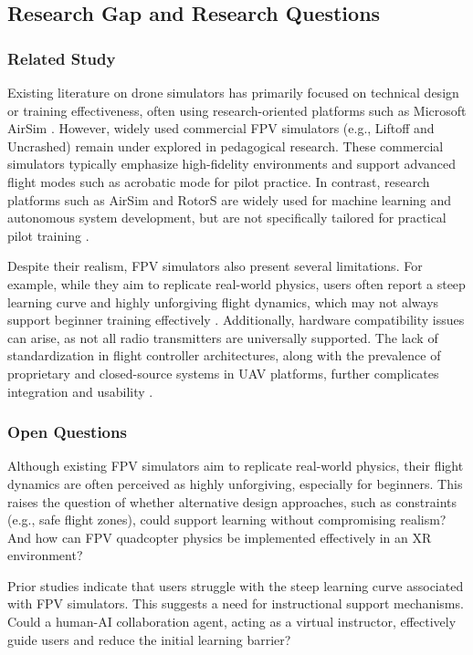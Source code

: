 \subsection{Research Gap and Research Questions}

\subsubsection{Related Study}

Existing literature on drone simulators has primarily focused on technical design or training effectiveness, often using research-oriented platforms such as Microsoft AirSim \parencite{shah_airsim_2017}. However, widely used commercial FPV simulators (e.g., Liftoff and Uncrashed) remain under explored in pedagogical research. These commercial simulators typically emphasize high-fidelity environments and support advanced flight modes such as acrobatic mode for pilot practice. In contrast, research platforms such as AirSim and RotorS are widely used for machine learning and autonomous system development, but are not specifically tailored for practical pilot training \parencite{pappas_generic_2025}.

Despite their realism, FPV simulators also present several limitations. For example, while they aim to replicate real-world physics, users often report a steep learning curve and highly unforgiving flight dynamics, which may not always support beginner training effectively \parencite{guide_best_2026}. Additionally, hardware compatibility issues can arise, as not all radio transmitters are universally supported. The lack of standardization in flight controller architectures, along with the prevalence of proprietary and closed-source systems in UAV platforms, further complicates integration and usability \parencite{ebeid_survey_2018}.

\subsubsection{Open Questions}

Although existing FPV simulators aim to replicate real-world physics, their flight dynamics are often perceived as highly unforgiving, especially for beginners. This raises the question of whether alternative design approaches, such as constraints (e.g., safe flight zones), could support learning without compromising realism? And how can FPV quadcopter physics be implemented effectively in an XR environment?

Prior studies indicate that users struggle with the steep learning curve associated with FPV simulators. This suggests a need for instructional support mechanisms. Could a human-AI collaboration agent, acting as a virtual instructor, effectively guide users and reduce the initial learning barrier?

